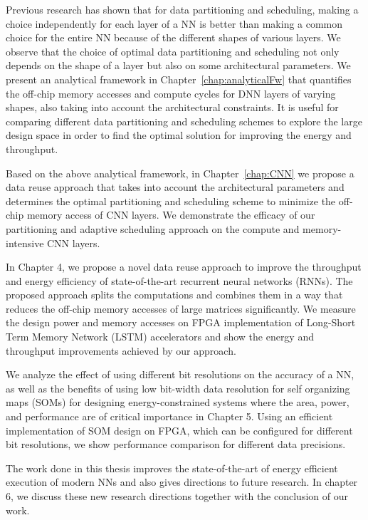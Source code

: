 Previous research has shown that for data partitioning and scheduling, making a choice independently for each layer of a NN is better than making a common choice for the entire NN because of the different shapes of various layers. We observe that the choice of optimal data partitioning and scheduling not only depends on the shape of a layer but also on some architectural parameters. We present an analytical framework in Chapter~\ref{chap:analyticalFw} that quantifies the off-chip memory accesses and compute cycles for DNN layers of varying shapes, also taking into account the architectural constraints. It is useful for comparing different data partitioning and scheduling schemes to explore the large design space in order to find the optimal solution for improving the energy and throughput. 

Based on the above analytical framework, in Chapter~\ref{chap:CNN} we propose a data reuse approach that takes into account the architectural parameters and determines the optimal partitioning and scheduling scheme to minimize the off-chip memory access of CNN layers. We demonstrate the efficacy of our partitioning and adaptive scheduling approach on the compute and memory-intensive CNN layers. 

In Chapter 4, we propose a novel data reuse approach to improve the throughput and energy efficiency of state-of-the-art recurrent neural networks (RNNs). The proposed approach splits the computations and combines them in a way that reduces the off-chip memory accesses of large matrices significantly. We measure the design power and memory accesses on FPGA implementation of Long-Short Term Memory Network (LSTM) accelerators and show the energy and throughput improvements achieved by our approach.
	
We analyze the effect of using different bit resolutions on the accuracy of a NN, as well as the benefits of using low bit-width data resolution for self organizing maps (SOMs) for designing energy-constrained systems where the area, power, and performance are of critical importance in Chapter 5. Using an efficient implementation of SOM design on FPGA, which can be configured for different bit resolutions, we show performance comparison for different data precisions. 

The work done in this thesis improves the state-of-the-art of energy efficient execution of modern NNs and also gives directions to future research. In chapter 6, we discuss these new research directions together with the conclusion of our work.